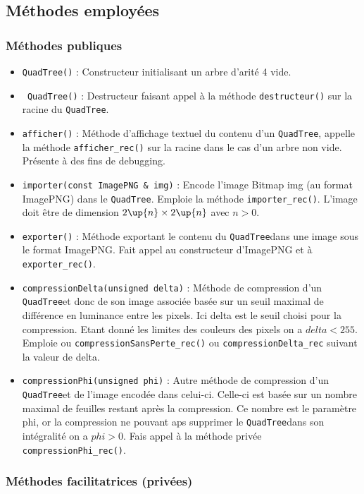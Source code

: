 \documentclass{article}
\newcommand{\info}{\texttt}
\newcommand{\qt}{\info{QuadTree}}
\begin{document}
    \subsection{Méthodes employées}

		\subsubsection{Méthodes publiques}
		
		\begin{itemize}
	    	\item \info{QuadTree()} : Constructeur initialisant un arbre d'arité 4 vide.
	    	\item \info{~QuadTree()} : Destructeur faisant appel à la méthode \info{destructeur()} sur la racine du \qt.
	    	\item \info{afficher()} : Méthode d'affichage textuel du contenu d'un \qt, appelle la méthode \info{afficher_rec()} sur la racine dans le cas d'un arbre non vide. Présente à des fins de debugging.
	    	\item \info{importer(const ImagePNG & img)} : Encode l'image Bitmap img (au format ImagePNG) dans le \qt. Emploie la méthode \info{importer_rec()}. L'image doit être de dimension $2\up{n}\times2\up{n}$ avec $n>0$.
	    	\item \info{exporter()} : Méthode exportant le contenu du \qt dans une image sous le format ImagePNG. Fait appel au constructeur d'ImagePNG et à \info{exporter_rec()}.
	    	\item \info{compressionDelta(unsigned delta)} : Méthode de compression d'un \qt et donc de son image associée basée sur un seuil maximal de différence en luminance entre les pixels. Ici delta est le seuil choisi pour la compression. Etant donné les limites des couleurs des pixels on a $delta<255$. Emploie ou \info{compressionSansPerte_rec()} ou \info{compressionDelta_rec} suivant la valeur de delta.
	    	\item \info{compressionPhi(unsigned phi)} : Autre méthode de compression d'un \qt et de l'image encodée dans celui-ci. Celle-ci est basée sur un nombre maximal de feuilles restant après la compression. Ce nombre est le paramètre phi, or la compression ne pouvant aps supprimer le \qt dans son intégralité on a $phi>0$. Fais appel à la méthode privée \info{compressionPhi_rec()}.
	    \end{itemize}
	    
	    \subsubsection{Méthodes facilitatrices (privées)}
	    
\end{document}
